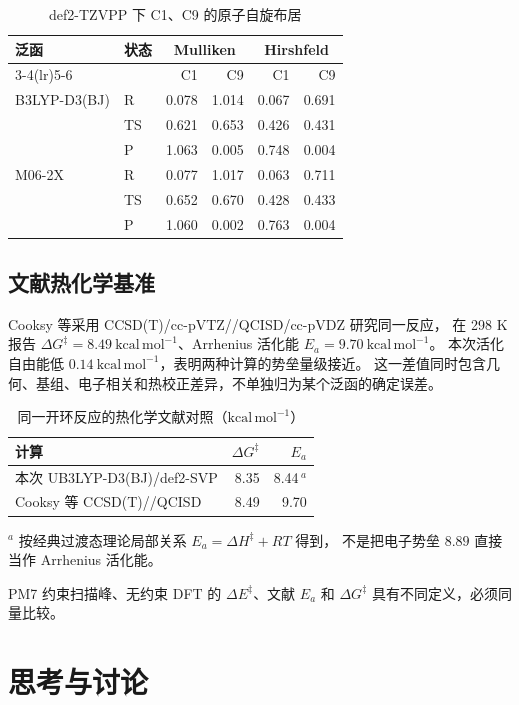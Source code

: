 \documentclass[UTF8,a4paper,12pt,fontset=fandol]{ctexart}
\newcommand{\kcal}{\mathrm{kcal\,mol^{-1}}}
\begin{document}
\begin{table}[htbp]
\centering\small\caption{def2-TZVPP 下 C1、C9 的原子自旋布居}\label{tab:popcompare}
\begin{tabular}{llrrrr}\toprule
泛函 & 状态 & \multicolumn{2}{c}{Mulliken} & \multicolumn{2}{c}{Hirshfeld}\\
\cmidrule(lr){3-4}\cmidrule(lr){5-6}
 & & C1 & C9 & C1 & C9\\\midrule
B3LYP-D3(BJ) & R & 0.078 & 1.014 & 0.067 & 0.691\\
 & TS & 0.621 & 0.653 & 0.426 & 0.431\\
 & P & 1.063 & 0.005 & 0.748 & 0.004\\\midrule
M06-2X & R & 0.077 & 1.017 & 0.063 & 0.711\\
 & TS & 0.652 & 0.670 & 0.428 & 0.433\\
 & P & 1.060 & 0.002 & 0.763 & 0.004\\\bottomrule
\end{tabular}
\end{table}
\FloatBarrier

\subsection{文献热化学基准}
Cooksy 等采用 CCSD(T)/cc-pVTZ//QCISD/cc-pVDZ 研究同一反应，
在 298 K 报告 $\Delta G^\ddagger=8.49\ \kcal$、Arrhenius 活化能
$E_a=9.70\ \kcal$\cite{cooksy}。
本次活化自由能低 $0.14\ \kcal$，表明两种计算的势垒量级接近。
这一差值同时包含几何、基组、电子相关和热校正差异，不单独归为某个泛函的确定误差。
\begin{table}[htbp]
\centering\small\caption{同一开环反应的热化学文献对照（$\kcal$）}
\begin{tabular}{lrr}\toprule
计算 & $\Delta G^\ddagger$ & $E_a$\\\midrule
本次 UB3LYP-D3(BJ)/def2-SVP & 8.35 & 8.44\,$^{a}$\\
Cooksy 等 CCSD(T)//QCISD\cite{cooksy} & 8.49 & 9.70\\\bottomrule
\end{tabular}
\par\smallskip\raggedright\footnotesize
$^{a}$ 按经典过渡态理论局部关系 $E_a=\Delta H^\ddagger+RT$ 得到，
不是把电子势垒 $8.89$ 直接当作 Arrhenius 活化能。
\end{table}
PM7 约束扫描峰、无约束 DFT 的 $\Delta E^\ddagger$、文献 $E_a$ 和
$\Delta G^\ddagger$ 具有不同定义，必须同量比较。

\section{思考与讨论}
\end{document}
